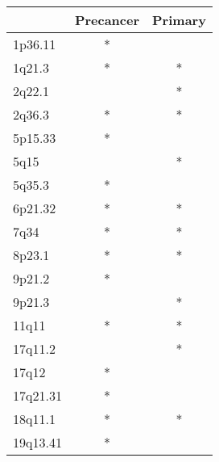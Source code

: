 \begin{tabular}{lcc}
\toprule
{} & Precancer & Primary \\
\midrule
1p36.11  &         * &         \\
1q21.3   &         * &       * \\
2q22.1   &           &       * \\
2q36.3   &         * &       * \\
5p15.33  &         * &         \\
5q15     &           &       * \\
5q35.3   &         * &         \\
6p21.32  &         * &       * \\
7q34     &         * &       * \\
8p23.1   &         * &       * \\
9p21.2   &         * &         \\
9p21.3   &           &       * \\
11q11    &         * &       * \\
17q11.2  &           &       * \\
17q12    &         * &         \\
17q21.31 &         * &         \\
18q11.1  &         * &       * \\
19q13.41 &         * &         \\
\bottomrule
\end{tabular}
